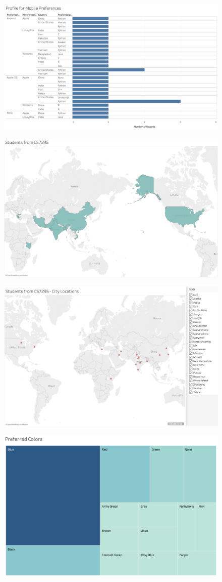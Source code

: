 \documentclass{neu_handout}
\begin{document}
\begin{figure}[h]
\centering
{
\includegraphics[width=0.7\linewidth]{profile}
}
\end{figure}


\begin{figure}[h]
\centering
{
\includegraphics[width=0.7\linewidth]{map}
}
\end{figure}

\begin{figure}[h]
\centering
{
\includegraphics[width=0.7\linewidth]{cities}
}
\end{figure}


\begin{figure}[h]
\centering
{
\includegraphics[width=0.7\linewidth]{colors}
}
\end{figure}
\end{document}
